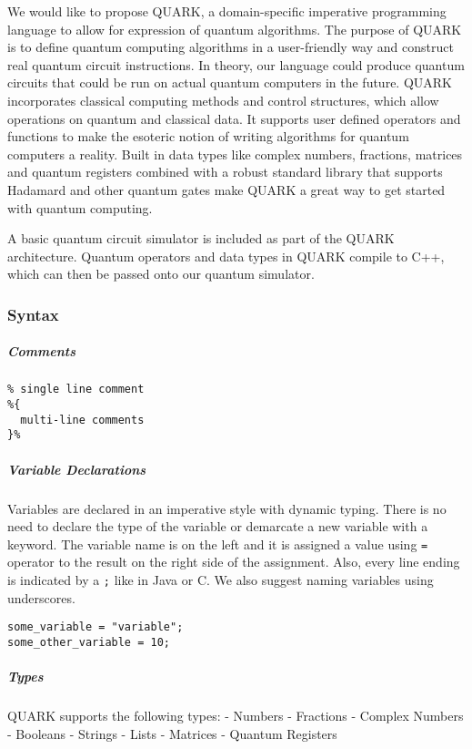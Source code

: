 \documentclass[]{article}
\begin{document}
We would like to propose QUARK, a domain-specific imperative programming
language to allow for expression of quantum algorithms. The purpose of
QUARK is to define quantum computing algorithms in a user-friendly way
and construct real quantum circuit instructions. In theory, our language
could produce quantum circuits that could be run on actual quantum
computers in the future. QUARK incorporates classical computing methods
and control structures, which allow operations on quantum and classical
data. It supports user defined operators and functions to make the
esoteric notion of writing algorithms for quantum computers a reality.
Built in data types like complex numbers, fractions, matrices and
quantum registers combined with a robust standard library that supports
Hadamard and other quantum gates make QUARK a great way to get started
with quantum computing.

A basic quantum circuit simulator is included as part of the QUARK
architecture. Quantum operators and data types in QUARK compile to C++,
which can then be passed onto our quantum simulator.

\subsubsection{Syntax}\label{syntax}

\subparagraph{Comments}\label{comments}

\begin{verbatim}
% single line comment
%{
  multi-line comments
}%
\end{verbatim}

\subparagraph{Variable Declarations}\label{variable-declarations}

Variables are declared in an imperative style with dynamic typing. There
is no need to declare the type of the variable or demarcate a new
variable with a keyword. The variable name is on the left and it is
assigned a value using \texttt{=} operator to the result on the right
side of the assignment. Also, every line ending is indicated by a
\texttt{;} like in Java or C. We also suggest naming variables using
underscores.

\begin{verbatim}
some_variable = "variable";
some_other_variable = 10;
\end{verbatim}

\subparagraph{Types}\label{types}

QUARK supports the following types: - Numbers - Fractions - Complex
Numbers - Booleans - Strings - Lists - Matrices - Quantum Registers
\end{document}
